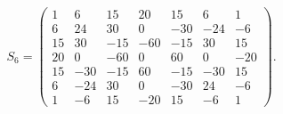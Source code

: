 \begingroup
\small
\setlength{\arraycolsep}{3pt}
\[
S_{6}=\begin{pmatrix}
1 & 6 & 15 & 20 & 15 & 6 & 1 \\
6 & 24 & 30 & 0 & -30 & -24 & -6 \\
15 & 30 & -15 & -60 & -15 & 30 & 15 \\
20 & 0 & -60 & 0 & 60 & 0 & -20 \\
15 & -30 & -15 & 60 & -15 & -30 & 15 \\
6 & -24 & 30 & 0 & -30 & 24 & -6 \\
1 & -6 & 15 & -20 & 15 & -6 & 1
\end{pmatrix}.
\]
\endgroup

